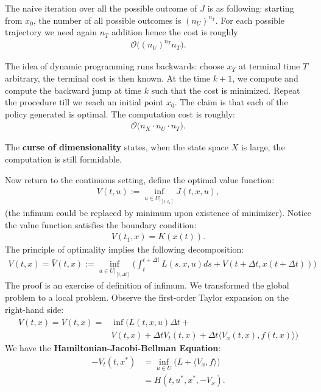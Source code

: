 \documentclass[a4paper,11pt,fleqn]{book}
\theoremstyle{definition}
\theoremstyle{remark}
\begin{document}
The naive iteration over all the possible outcome of $J$ is as following: starting from  $x_0$, the number of all possible outcomes is $(n_U)^{n_T}$. For each possible trajectory we need again $n_T$ addition hence the cost is roughly
\begin{align*}
	\mathcal{O} \bigg( (n_U)^{n_T} n_T \bigg).
\end{align*}

The idea of dynamic programming runs backwards: choose $x_T$ at terminal time $T$ arbitrary, the terminal cost is then known. At the time $k + 1$, we compute and compute the backward jump at time $k$ such that the cost is minimized. Repeat the procedure till we reach an initial point $x_0$. The claim is that each of the policy generated is optimal. The computation cost is roughly:
\begin{align*}
	\mathcal{O}\bigg( n_X \cdot  n_U \cdot n_T \bigg).
\end{align*}

The \textbf{curse of dimensionality} states, when the state space $X$ is large, the computation is still formidable.\par 
\quad\par 
Now return to the continuous setting, define the optimal value function:
\begin{align*}
	V(t, u):= \inf_{u \in U|_{[t, t_1]}} J(t, x, u),
\end{align*}
(the infimum could be replaced by minimum upon existence of minimizer). Notice the value function satisfies the boundary condition:
\begin{align*}
	V(t_1, x) = K(x(t)).
\end{align*}
The principle of optimality implies the following decomposition: 
\begin{align*}
	V(t, x) = \bar{V}(t, x) := \inf_{u \in U|_{[t, \Delta t]}} \bigg( \int_{t}^{t + \Delta t} L(s, x, u) ds + V(t + \Delta t, x(t + \Delta t)) \bigg)
\end{align*}
The proof is an exercise of definition of infimum. We transformed the global problem to a local problem. Observe the first-order Taylor expansion on the right-hand side:
\begin{align*}
	V(t, x) = \bar{V}(t, x) = &\inf \bigg(L(t, x, u) \Delta t +   \\ &V(t, x) + \Delta t V_t(t, x) + \Delta t \langle V_x(t, x),  f(t, x) \rangle \bigg)  
\end{align*} 
We have the \textbf{Hamiltonian-Jacobi-Bellman Equation}:
\begin{align*}
	-V_t(t, x^*) &= \inf_{u \in U} \bigg(L + \langle V_x , f \rangle\bigg)\\
	&=  H(t, u^*, x^*, - V_x).
\end{align*}
\end{document}

